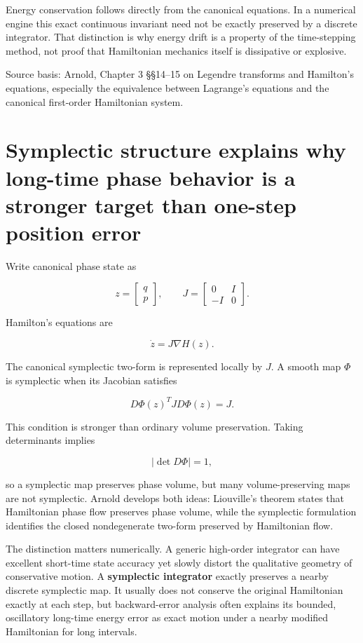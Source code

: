 Energy conservation follows directly from the canonical equations. In a numerical engine this exact continuous invariant need not be exactly preserved by a discrete integrator. That distinction is why energy drift is a property of the time-stepping method, not proof that Hamiltonian mechanics itself is dissipative or explosive.

Source basis: Arnold, Chapter 3 §§14--15 on Legendre transforms and Hamilton's equations, especially the equivalence between Lagrange's equations and the canonical first-order Hamiltonian system.

\section{Symplectic structure explains why long-time phase behavior is a stronger target than one-step position error}\label{02-foundations-ii-ch039-symplectic-structure-explains-why-long-time-phase-behavior-is-a-stronger-target-than-one-step-position-error}

Write canonical phase state as

\[
z=
\begin{bmatrix}
q\\p
\end{bmatrix},
\qquad
J=
\begin{bmatrix}
0&I\\
-I&0
\end{bmatrix}.
\]

Hamilton's equations are

\[
\dot z
=
J\nabla H(z).
\]

The canonical symplectic two-form is represented locally by \(J\). A smooth map \(\Phi\) is symplectic when its Jacobian satisfies

\[
D\Phi(z)^T J D\Phi(z)=J.
\]

This condition is stronger than ordinary volume preservation. Taking determinants implies

\[
|\det D\Phi|=1,
\]

so a symplectic map preserves phase volume, but many volume-preserving maps are not symplectic. Arnold develops both ideas: Liouville's theorem states that Hamiltonian phase flow preserves phase volume, while the symplectic formulation identifies the closed nondegenerate two-form preserved by Hamiltonian flow.

The distinction matters numerically. A generic high-order integrator can have excellent short-time state accuracy yet slowly distort the qualitative geometry of conservative motion. A \textbf{symplectic integrator} exactly preserves a nearby discrete symplectic map. It usually does not conserve the original Hamiltonian exactly at each step, but backward-error analysis often explains its bounded, oscillatory long-time energy error as exact motion under a nearby modified Hamiltonian for long intervals.

